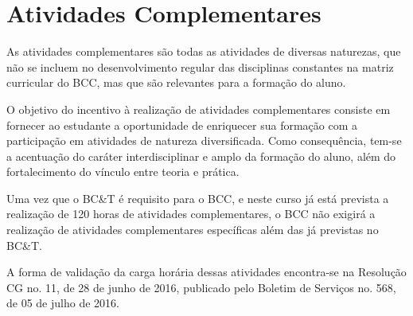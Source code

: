 \section {Atividades Complementares}

As atividades complementares são todas as atividades de diversas naturezas, que não se incluem no desenvolvimento regular das disciplinas constantes na matriz curricular do BCC, mas que são relevantes para a formação do aluno.

O objetivo do incentivo à realização de atividades complementares consiste em fornecer ao estudante a oportunidade de enriquecer sua formação com a participação em atividades de natureza diversificada. Como consequência, tem-se a acentuação do caráter interdisciplinar e amplo da formação do aluno, além do fortalecimento do vínculo entre teoria e prática.

Uma vez que o BC\&T é requisito para o BCC, e neste curso já está prevista a realização de 120 horas de atividades complementares, o BCC não exigirá a realização de atividades complementares específicas além das já previstas no BC\&T. 

A forma de validação da carga horária dessas atividades encontra-se na Resolução CG no. 11, de 28 de junho de 2016, publicado pelo Boletim de Serviços no. 568, de 05 de julho de 2016.
